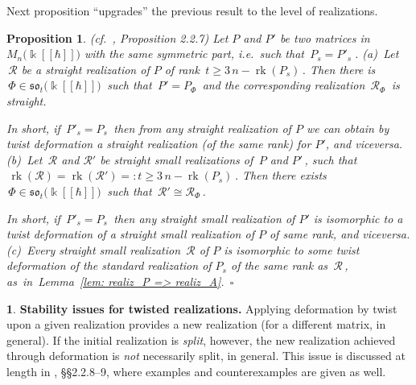 \documentclass[12pt,reqno,twoside,a4paper]{amsart}
\numberwithin{equation}{section}
\newtheorem{prop}[lema]{Proposition}
\theoremstyle{definition}
\newtheorem{free text}[lema]{}
\theoremstyle{remark}
\newcommand \rk{\operatorname{rk}}
\newcommand{\R}{{\mathcal R}}
\def \kh{{\Bbbk[[\hbar]]}}
\def \lieso{\mathfrak{so}}
\theoremstyle{plain}
\begin{document}
\vskip7pt

   Next proposition ``upgrades'' the previous result to the level of realizations.

\vskip11pt

\begin{prop}  \label{prop: realiz=twist-standard}
  \textsl{(cf.\ \cite{GG3}, Proposition 2.2.7)}
%
 Let  $ P $  and  $ P' $  be two matrices in  $ M_n\big(\kh\big) $  with the same symmetric part, i.e.\ such that  $ \, P_s = P'_s \; $.
%
 \vskip5pt
%
   (a)\,  Let  $ \, \R $  be a  \textsl{straight}  realization of  $ P $ of rank  $ \, t \geq 3\,n-\rk(P_s) \, $.  Then there is  $ \, \Phi \in \lieso_t\big(\kh\big) \, $  such that  $ \, P' = P_{\scriptscriptstyle \Phi} \, $  and the corresponding realization  $ \, \R_{\scriptscriptstyle \Phi} \, $  is straight.
                                                            \par
   In short, if  $ \, P'_s = P_s \, $  then from any  \textsl{straight}  realization of  $ P $  we can obtain by twist deformation a straight realization (of the same rank) for  $ P' $,  and viceversa.
%
 \vskip5pt
%
   (b)\,  Let  $ \, \R $  and  $ \R' $  be  \textsl{straight small}  realizations of  $ \, P $  and  $ P' \, $,  such that  $ \, \rk(\R) = \rk(\R') =: t \geq 3\,n-\rk(P_s) \, $.
   Then there exists
%
 $ \, \Phi \in \lieso_t\big(\kh\big)
 \, $  such that  $ \, \R' \cong \R_{\scriptscriptstyle \Phi} \, $.
%
                                                            \par
   In short, if  $ \, P'_s = P_s \, $  then any straight small realization of  $ P' $  is isomorphic to a twist deformation of a
   straight small realization of  $ P $  of same rank, and viceversa.
%
 \vskip5pt
%
   (c)\,  Every  \textsl{straight small}  realization  $ \, \R $  of  $ P $  is isomorphic to some
   twist deformation of the standard realization of  $ P_s $  of the same rank as  $ \, \R \, $,
   \hbox{as in  Lemma \ref{lem: realiz_P => realiz_A}.   \hfill  $ \square $}
%
\end{prop}

\vskip11pt

\begin{free text}  \label{further_stability}
%
 {\bf Stability issues for twisted realizations.}  Applying deformation by twist upon a given realization provides a new realization (for a different matrix, in general).  If the initial realization is  \textsl{split},  however, the new realization achieved through deformation is  \textsl{not\/}  necessarily split, in general.  This issue is discussed at length in  \cite{GG3}, \S\S 2.2.8--9,  where examples and counterexamples are given as well.
%
\end{free text}
\end{document}
